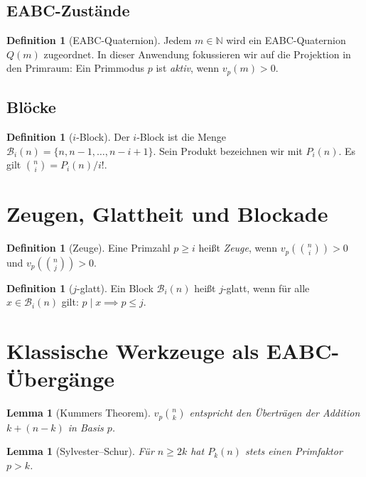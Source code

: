 \documentclass[12pt,a4paper]{article}
\theoremstyle{plain}
\newtheorem{lemma}[theorem]{Lemma}
\theoremstyle{definition}
\newtheorem{definition}[theorem]{Definition}
\theoremstyle{remark}
\begin{document}
	\subsection{EABC-Zustände}
	
	\begin{definition}[EABC-Quaternion]
		Jedem $m\in\mathbb N$ wird ein EABC-Quaternion $Q(m)$ zugeordnet. In dieser Anwendung fokussieren wir auf die Projektion in den Primraum: Ein Primmodus $p$ ist \emph{aktiv}, wenn $v_p(m) > 0$.
	\end{definition}
	
	\subsection{Blöcke}
	
	\begin{definition}[$i$-Block]
		Der $i$-Block ist die Menge $\mathcal B_i(n) = \{n, n-1, \dots, n-i+1\}$. Sein Produkt bezeichnen wir mit $P_i(n)$. Es gilt $\binom{n}{i} = P_i(n)/i!$.
	\end{definition}
	
	\section{Zeugen, Glattheit und Blockade}
	
	\begin{definition}[Zeuge]
		Eine Primzahl $p\ge i$ heißt \emph{Zeuge}, wenn $v_p(\binom{n}{i}) > 0$ und $v_p(\binom{n}{j}) > 0$.
	\end{definition}
	
	\begin{definition}[$j$-glatt]
		Ein Block $\mathcal B_i(n)$ heißt $j$-glatt, wenn für alle $x \in \mathcal B_i(n)$ gilt: $p \mid x \implies p \le j$.
	\end{definition}
	
	\section{Klassische Werkzeuge als EABC-Übergänge}
	
	\begin{lemma}[Kummers Theorem]
		$v_p\binom{n}{k}$ entspricht den Überträgen der Addition $k + (n-k)$ in Basis $p$.
	\end{lemma}
	
	\begin{lemma}[Sylvester--Schur]
		Für $n \ge 2k$ hat $P_k(n)$ stets einen Primfaktor $p > k$.
	\end{lemma}
	
\end{document}
